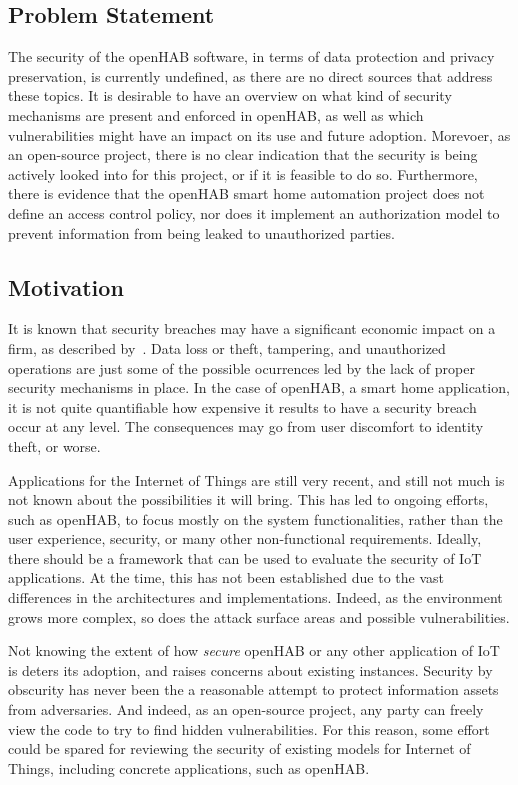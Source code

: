 \documentclass[12pt]{article}
\begin{document}
\subsection{Problem Statement}

The security of the openHAB software, in terms of data protection and privacy preservation, is currently undefined, as there are no direct sources that address these topics. It is desirable to have an overview on what kind of security mechanisms are present and enforced in openHAB, as well as which vulnerabilities might have an impact on its use and future adoption. Morevoer, as an open-source project, there is no clear indication that the security is being actively looked into for this project, or if it is feasible to do so. Furthermore, there is evidence that the openHAB smart home automation project does not define an access control policy, nor does it implement an authorization model to prevent information from being leaked to unauthorized parties. 

\subsection{Motivation}

It is known that security breaches may have a significant economic impact on a firm, as described by~\cite{GOEL}. Data loss or theft, tampering, and unauthorized operations are just some of the possible ocurrences led by the lack of proper security mechanisms in place. In the case of openHAB, a smart home application, it is not quite quantifiable how expensive it results to have a security breach occur at any level. The consequences may go from user discomfort to identity theft, or worse.

Applications for the Internet of Things are still very recent, and still not much is not known about the possibilities it will bring. This has led to ongoing efforts, such as openHAB, to focus mostly on the system functionalities, rather than the user experience, security, or many other non-functional requirements. Ideally, there should be a framework that can be used to evaluate the security of IoT applications. At the time, this has not been established due to the vast differences in the architectures and implementations. Indeed, as the environment grows more complex, so does the attack surface areas and possible vulnerabilities.

Not knowing the extent of how \emph{secure} openHAB or any other application of IoT is deters its adoption, and raises concerns about existing instances. Security by obscurity has never been the a reasonable attempt to protect information assets from adversaries. And indeed, as an open-source project, any party can freely view the code to try to find hidden vulnerabilities. For this reason, some effort could be spared for reviewing the security of existing models for Internet of Things, including concrete applications, such as openHAB.
\end{document}
